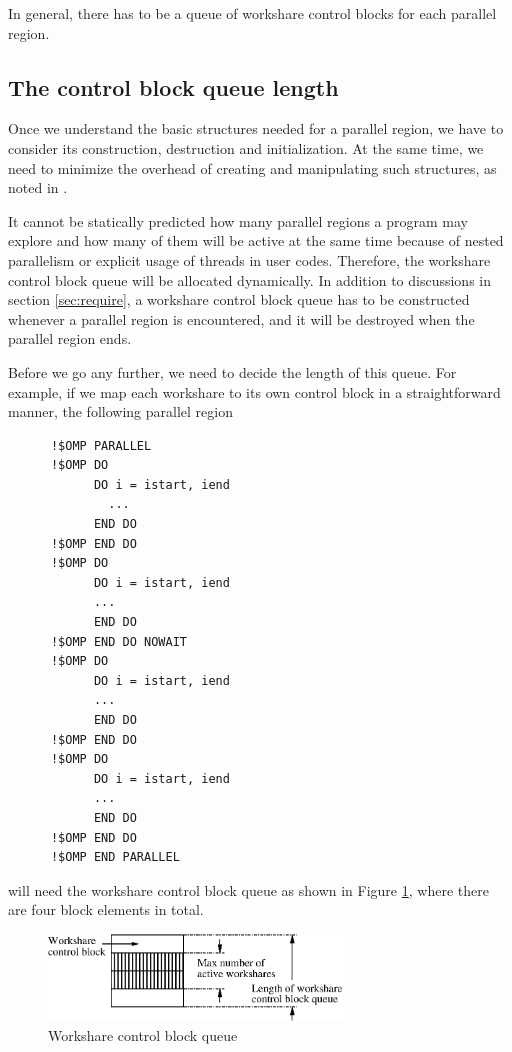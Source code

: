 
In general, there has to be a queue of workshare control blocks for
each parallel region.

\subsection{The control block queue length}
\label{sec:size}

Once we understand the basic structures needed for a parallel region,
we have to consider its construction, destruction and initialization.
At the same time, we need to minimize the overhead of creating and
manipulating such structures, as noted in \cite{Bul99}.

It cannot be statically predicted how many parallel regions a program
may explore and how many of them will be active at the same time because 
of nested parallelism or explicit usage of threads in user codes.
Therefore, the workshare control block queue will be allocated
dynamically. In addition to discussions in section \ref{sec:require}, a
workshare control block queue has to be constructed whenever a
parallel region is encountered, and it will be destroyed when the
parallel region ends.

Before we go any further, we need to decide the length of this queue.
For example, if we map each workshare to its own control block
in a straightforward manner, the following parallel region

{\small
\begin{verbatim}
      !$OMP PARALLEL 
      !$OMP DO
            DO i = istart, iend
              ...
            END DO
      !$OMP END DO
      !$OMP DO
            DO i = istart, iend
            ...
            END DO 
      !$OMP END DO NOWAIT
      !$OMP DO
            DO i = istart, iend
            ...
            END DO
      !$OMP END DO
      !$OMP DO
            DO i = istart, iend
            ...
            END DO
      !$OMP END DO
      !$OMP END PARALLEL
\end{verbatim}
}

will need the workshare control block queue as shown in Figure
\ref{fig:queue}, where there are four block elements in total.

\begin{figure}[!h]
  \begin{center}
    \includegraphics[angle=0, width=0.7\textwidth]{queue.eps}
    \caption{\footnotesize Workshare control block queue}
    \label{fig:queue}
  \end{center}
\end{figure}

